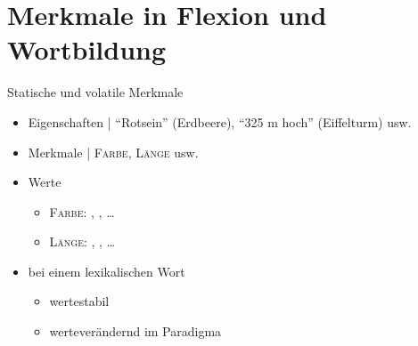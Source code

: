 \section{Merkmale in Flexion und Wortbildung}

\begin{frame}
  {Statische und volatile Merkmale}
  \pause
  \begin{itemize}[<+->]
    \item Eigenschaften | "`Rotsein"' (Erdbeere), "`325 m hoch"' (Eiffelturm) usw.
    \item Merkmale | \alert{\textsc{Farbe}}, \alert{\textsc{Länge}} usw.
    \item Werte
      \begin{itemize}[<+->]
        \item \alert{\textsc{Farbe}}: , , \ldots
        \item \alert{\textsc{Länge}}: \rot{\textit{3 cm}}, , \ldots
      \end{itemize}
  \end{itemize}
  \pause
  \Halbzeile 
  \begin{exe}
    \ex
    \begin{xlist}
      \pause
      \pause
    \end{xlist}
  \end{exe}
  \Halbzeile
  \pause
  \begin{itemize}[<+->]
    \item bei einem lexikalischen Wort
      \begin{itemize}
        \item {} wertestabil
        \item {} werteverändernd im Paradigma
      \end{itemize}
  \end{itemize}
\end{frame}


